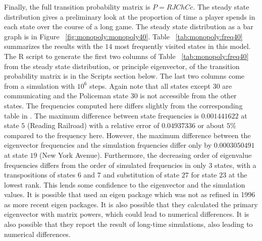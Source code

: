 \documentclass[12pt]{article}
\begin{document}
Finally, the full transition probability matrix is \( P = R J \mathit{Ch}
\mathit{Cc} \).  The steady state distribution gives a preliminary look
at the proportion of time a player spends in each state over the course
of a long game.  The steady state distribution as a bar graph is in
Figure~%
\ref{fig:monopoly:monopoly40}.  Table~%
\ref{tab:monopoly:freq40} summarizes the results with the \( 14 \) most
frequently visited states in this model.  The R script to generate the
first two columns of Table~%
\ref{tab:monopoly:freq40} from the steady state distribution,  or principle
eigenvector, of the transition probability matrix is in the Scripts
section below.  The last two
columns come from a simulation with \( 10^6 \) steps.
Again note that all states except \( 30 \) are
communicating and the Policeman state \( 30 \) is not accessible from
the other states.  The frequencies computed here differs slightly from the
corresponding table in
\cite{abbott97}.  The maximum difference between state frequencies is \(
0.001441622 \) at state \( 5 \) (Reading Railroad) with a relative error
of \( 0.04937336 \) or about \( 5\% \) compared to the frequency here.
However, the maximum difference between the eigenvector frequencies and
the simulation frquencies differ only by \( 0.0003050491 \) at state \(
19 \) (New York Avenue).  Furthermore, the decreasing order of
eigenvalue frequencies differs from the order of simulated frequencies
in only \( 3 \) states, with a transpositions of states \( 6 \) and \( 7
\) and substitution of state \( 27 \) for state \( 23 \) at the lowest
rank.  This lends some confidence to the eigenvector and the simulation
values.  It is possible that
\cite{abbott97} used an eigen package which was not as refined in 1996 as
more recent eigen packages.  It is also possible that they calculated
the primary eigenvector with matrix powers, which could lead to
numerical differences.  It is also possible that they report the result
of long-time simulations, also leading to numerical differences.
\end{document}
